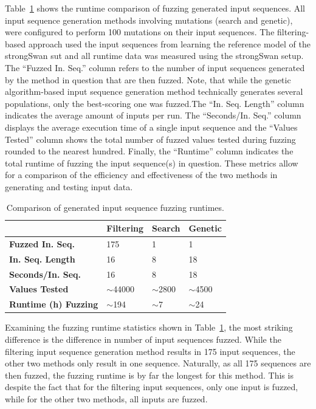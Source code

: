 Table~\ref{tab:compfuzz} shows the runtime comparison of fuzzing generated input sequences. All input sequence generation methods involving mutations (search and genetic), were configured to perform 100 mutations on their input sequences. The filtering-based approach used the input sequences from learning the reference model of the strongSwan \ac{sut} and all runtime data was measured using the strongSwan setup. The ``Fuzzed In. Seq.'' column refers to the number of input sequences generated by the method in question that are then fuzzed. Note, that while the genetic algorithm-based input sequence generation method technically generates several populations, only the best-scoring one was fuzzed.The ``In. Seq. Length'' column indicates the average amount of inputs per run. The ``Seconds/In. Seq.'' column displays the average execution time of a single input sequence and the ``Values Tested'' column shows the total number of fuzzed values tested during fuzzing rounded to the nearest hundred. Finally, the ``Runtime'' column indicates the total runtime of fuzzing the input sequence(s) in question. These metrics allow for a comparison of the efficiency and effectiveness of the two methods in generating and testing input data.


\begin{table}[h]
	\centering
	\begin{tabular}{|l|l|l|l|}
		\hline
		\rowcolor[HTML]{EFEFEF} 
		& \textbf{Filtering}					& \textbf{Search} 			& \textbf{Genetic}  \\ \hline
		\textbf{Fuzzed In. Seq.}            	& 175                 					& 1                			& 1					\\ \hline
		\textbf{In. Seq. Length}				& 16                					& 8               			& 18		  		\\ \hline
		\textbf{Seconds/In. Seq.}     			& 16                					& 8                			& 18				\\ \hline
		\textbf{Values Tested}     				& $\sim$44000              				& $\sim$2800		    	& $\sim$4500		\\ \hline
		\textbf{Runtime (h) Fuzzing}       		& $\sim$194          	 				& $\sim$7          			& $\sim$24			\\ \hline
	\end{tabular}
	\caption{Comparison of generated input sequence fuzzing runtimes.}
	\label{tab:compfuzz}
\end{table}

Examining the fuzzing runtime statistics shown in Table~\ref{tab:compfuzz}, the most striking difference is the difference in number of input sequences fuzzed. While the filtering input sequence generation method results in 175 input sequences, the other two methods only result in one sequence. Naturally, as all 175 sequences are then fuzzed, the fuzzing runtime is by far the longest for this method. This is despite the fact that for the filtering input sequences, only one input is fuzzed, while for the other two methods, all inputs are fuzzed. 

